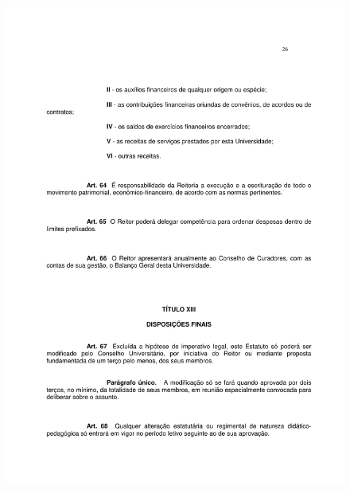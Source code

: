 \begin{figure}[p]
	\centering 
	\includegraphics[scale=0.7]{capitulos/resolucoes/cuni414/cuni414-26.pdf}
\end{figure} \pagebreak

